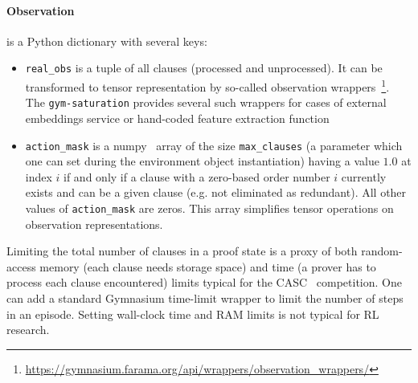 \documentclass[runningheads]{llncs}
\begin{document}
\paragraph{Observation} is a Python dictionary with several keys:
\begin{itemize}
\item \texttt{real\_obs} is a tuple of all clauses (processed and unprocessed). It can be transformed to tensor representation by so-called observation wrappers~\footnote{\url{https://gymnasium.farama.org/api/wrappers/observation_wrappers/}}. The \texttt{gym-saturation} provides several such wrappers for cases of external embeddings service or hand-coded feature extraction function
\item \texttt{action\_mask} is a numpy~\cite{harris2020array} array of the size \texttt{max\_clauses} (a parameter which one can set during the environment object instantiation) having a value $1.0$ at index $i$ if and only if a clause with a zero-based order number $i$ currently exists and can be a given clause (e.g. not eliminated as redundant). All other values of \texttt{action\_mask} are zeros. This array simplifies tensor operations on observation representations.
\end{itemize}
Limiting the total number of clauses in a proof state is a proxy of both random-access memory (each clause needs storage space) and time (a prover has to process each clause encountered) limits typical for the CASC~\cite{DBLP:journals/aicom/Sutcliffe21} competition. One can add a standard Gymnasium time-limit wrapper to limit the number of steps in an episode. Setting wall-clock time and RAM limits is not typical for RL research.
\end{document}
